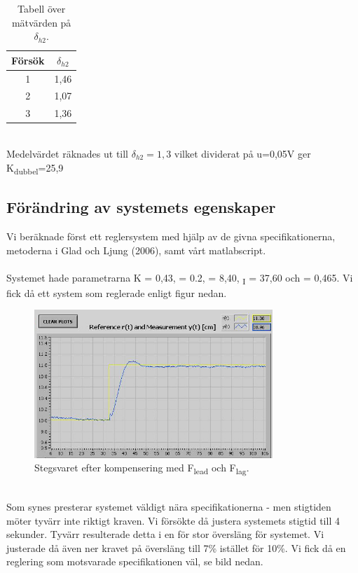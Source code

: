 \documentclass{article}
\begin{document}
\begin{table}[ht] 
\centering 
\begin{tabular}{c c} 
Försök & $\delta_{h2}$ \\ [0.5ex] %
\hline
1 & 1,46 \\
2 & 1,07 \\
3 & 1,36 \\

\end{tabular} 
\caption{Tabell över mätvärden på $\delta_{h2}$.}
\end{table}
~\\ %
Medelvärdet räknades ut till $\delta_{h2}=1,3$ vilket dividerat på u=0,05V ger K\textsubscript{dubbel}=25,9
\newpage

\subsection{Förändring av systemets egenskaper}

Vi beräknade först ett reglersystem med hjälp av de givna specifikationerna, metoderna i Glad och Ljung (2006), samt vårt matlabscript. 
\\
\\
Systemet hade parametrarna K = 0,43, \textbeta = 0.2,  = 8,40, {\textsubscript{I}} = 37,60 och \textgamma = 0,465. Vi fick då ett system som reglerade enligt figur nedan. 

\begin{figure}[ht!]
\centering
\includegraphics[width=90mm]{Test1_cut.jpg}
\caption{Stegsvaret efter kompensering med F\textsubscript{lead} och F\textsubscript{lag}.}
\label{overflow}
\end{figure}
~\\
Som synes presterar systemet väldigt nära specifikationerna - men stigtiden möter tyvärr inte riktigt kraven. Vi försökte då justera systemets stigtid till 4 sekunder. Tyvärr resulterade detta i en för stor översläng för systemet. Vi justerade då även ner kravet på översläng till 7\% istället för 10\%. Vi fick då en reglering som motsvarade specifikationen väl, se bild nedan. 
\end{document}
